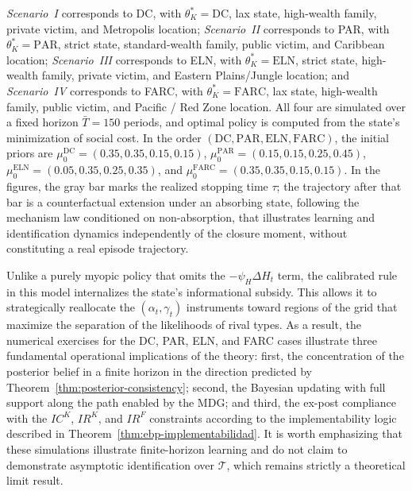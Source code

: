 \documentclass[review,authoryear,12pt]{elsarticle}
\theoremstyle{plain}
\theoremstyle{definition}
\newcommand{\1}{\mathbf{1}}
\begin{document}
\emph{Scenario~I} corresponds to DC, with $\theta_K^\ast=\mathrm{DC}$, lax state, high-wealth family, private victim, and Metropolis location; \emph{Scenario~II} corresponds to PAR, with $\theta_K^\ast=\mathrm{PAR}$, strict state, standard-wealth family, public victim, and Caribbean location; \emph{Scenario~III} corresponds to ELN, with $\theta_K^\ast=\mathrm{ELN}$, strict state, high-wealth family, private victim, and Eastern Plains/Jungle location; and \emph{Scenario~IV} corresponds to FARC, with $\theta_K^\ast=\mathrm{FARC}$, lax state, high-wealth family, public victim, and Pacific / Red Zone location. All four are simulated over a fixed horizon $\bar{T}=150$ periods, and optimal policy is computed from the state's minimization of social cost. In the order $(\mathrm{DC},\mathrm{PAR},\mathrm{ELN},\mathrm{FARC})$, the initial priors are $\mu_0^{\mathrm{DC}}=(0.35,0.35,0.15,0.15)$, $\mu_0^{\mathrm{PAR}}=(0.15,0.15,0.25,0.45)$, $\mu_0^{\mathrm{ELN}}=(0.05,0.35,0.25,0.35)$, and $\mu_0^{\mathrm{FARC}}=(0.35,0.35,0.15,0.15)$. In the figures, the gray bar marks the realized stopping time $\tau$; the trajectory after that bar is a counterfactual extension under an absorbing state, following the mechanism law conditioned on non-absorption, that illustrates learning and identification dynamics independently of the closure moment, without constituting a real episode trajectory.

Unlike a purely myopic policy that omits the $-\psi_H\Delta H_t$ term, the calibrated rule in this model internalizes the state's informational subsidy. This allows it to strategically reallocate the $(\alpha_t,\gamma_t)$ instruments toward regions of the grid that maximize the separation of the likelihoods of rival types. As a result, the numerical exercises for the DC, PAR, ELN, and FARC cases illustrate three fundamental operational implications of the theory: first, the concentration of the posterior belief in a finite horizon in the direction predicted by Theorem~\ref{thm:posterior-consistency}; second, the Bayesian updating with full support along the path enabled by the MDG; and third, the ex-post compliance with the $IC^K$, $IR^K$, and $IR^F$ constraints according to the implementability logic described in Theorem~\ref{thm:ebp-implementabilidad}. It is worth emphasizing that these simulations illustrate finite-horizon learning and do not claim to demonstrate asymptotic identification over $\mathcal{T}$, which remains strictly a theoretical limit result.
\end{document}
